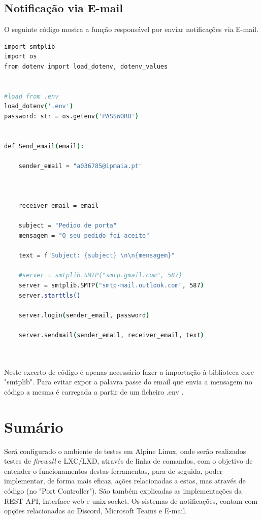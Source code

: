 \subsection{Notificação via E-mail}

O seguinte código mostra a função responsável por enviar notificações via E-mail.

\begin{lstlisting}[language=csh, caption={Teste de notificação via Microsoft Teams}]
import smtplib
import os
from dotenv import load_dotenv, dotenv_values


#load from .env
load_dotenv('.env')
password: str = os.getenv('PASSWORD')


def Send_email(email):
    
    sender_email = "a036785@ipmaia.pt"

    
    
    receiver_email = email
    
    subject = "Pedido de porta"
    mensagem = "O seu pedido foi aceite"
    
    text = f"Subject: {subject} \n\n{mensagem}"
    
    #server = smtplib.SMTP("smtp.gmail.com", 587)
    server = smtplib.SMTP("smtp-mail.outlook.com", 587)
    server.starttls()
    
    server.login(sender_email, password)
    
    server.sendmail(sender_email, receiver_email, text)
    
        
\end{lstlisting}

Neste excerto de código é apenas necessário fazer a importação à biblioteca core
"smtplib". 
Para evitar expor a palavra passe do email que envia a mensagem no código a mesma 
é carregada a partir de um ficheiro .env .





\section*{Sumário}

Será configurado o ambiente de testes em Alpine Linux, onde serão realizados testes
de \textit{firewall} e LXC/LXD, através de linha de comandos, com o objetivo de entender 
o funcionamentos destas ferramentas, para de seguida, poder implementar, de forma mais eficaz,
ações relacionadas a estas, mas através de código (no "Port Controller").
São também explicadas as implementações da REST API, Interface web e unix socket. 
Os sistemas de notificações, contam com opções relacionadas ao Discord, Microsoft
Teams e E-mail.







